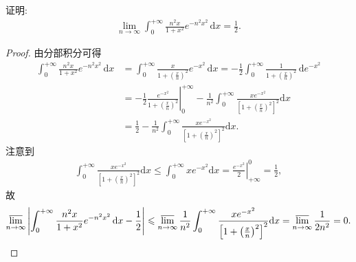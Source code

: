 \documentclass[../../main.tex]{subfiles}%
\begin{document}
\begin{example}
证明:
\begin{align*}
\lim_{n \to \infty} \int_0^{+\infty} \frac{n^2 x}{1 + x^2} e^{-n^2 x^2} \, \mathrm{d}x = \frac{1}{2}.
\end{align*}
\end{example}
\begin{proof}
由分部积分可得
\begin{align*}
\int_0^{+\infty} \frac{n^2 x}{1 + x^2} e^{-n^2 x^2} \, \mathrm{d}x &= \int_0^{+\infty} \frac{x}{1 + \left( \frac{x}{n} \right)^2} e^{-x^2} \, \mathrm{d}x = -\frac{1}{2} \int_0^{+\infty} \frac{1}{1 + \left( \frac{x}{n} \right)^2} \, \mathrm{d}e^{-x^2} \\
&= -\frac{1}{2} \left. \frac{e^{-x^2}}{1 + \left( \frac{x}{n} \right)^2} \right|_0^{+\infty} - \frac{1}{n^2} \int_0^{+\infty} \frac{x e^{-x^2}}{\left[ 1 + \left( \frac{x}{n} \right)^2 \right]^2} \mathrm{d}x \\
&= \frac{1}{2} - \frac{1}{n^2} \int_0^{+\infty} \frac{x e^{-x^2}}{\left[ 1 + \left( \frac{x}{n} \right)^2 \right]^2} \mathrm{d}x.
\end{align*}
注意到
\begin{align*}
\int_0^{+\infty} \frac{x e^{-x^2}}{\left[ 1 + \left( \frac{x}{n} \right)^2 \right]^2} \mathrm{d}x \leqslant \int_0^{+\infty} x e^{-x^2} \mathrm{d}x = \left. \frac{e^{-x^2}}{2} \right|_{+\infty}^0 = \frac{1}{2},
\end{align*}
故
\begin{align*}
\varlimsup_{n \to \infty} \left| \int_0^{+\infty} \frac{n^2 x}{1 + x^2} e^{-n^2 x^2} \, \mathrm{d}x - \frac{1}{2} \right| \leqslant \varlimsup_{n \to \infty} \frac{1}{n^2} \int_0^{+\infty} \frac{x e^{-x^2}}{\left[ 1 + \left( \frac{x}{n} \right)^2 \right]^2} \mathrm{d}x = \varlimsup_{n \to \infty} \frac{1}{2n^2} = 0.
\end{align*}
\end{proof}
\end{document}
